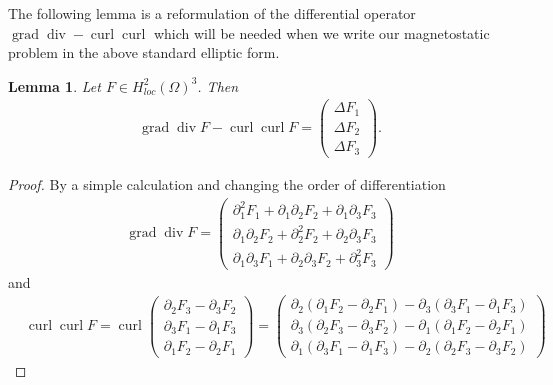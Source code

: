 \documentclass[12pt,a4paper]{article}
\numberwithin{equation}{subsection}
\newtheorem{lemma}{Lemma}[section]
\numberwithin{lemma}{subsection}
\theoremstyle{definition}
\DeclareMathOperator{\curl}{curl}
\DeclareMathOperator{\diver}{div}
\DeclareMathOperator{\grad}{grad}
\begin{document}
The following lemma is a reformulation of the differential operator 
$\grad \diver - \curl \curl$ which will be needed when we write our 
magnetostatic problem in the above standard elliptic form.

\begin{lemma}\label{lem:graddiv_curlcurl_equals_componentwise_laplacian}
    Let $F \in H^2_{loc}(\Omega)^3$. Then 
    \begin{align*}
        \grad \diver F - \curl \curl F 
        = \begin{pmatrix} \Delta F_1 \\ \Delta F_2 
            \\ \Delta F_3  \end{pmatrix}.
    \end{align*}
\end{lemma}
\begin{proof}
    By a simple calculation and changing the order of differentiation
    \begin{align*}
        \grad \diver F = 
            \begin{pmatrix} \partial_1^2 F_1 + \partial_1 \partial_2 F_2
                + \partial_1 \partial_3 F_3
            \\ \partial_1\partial_2 F_2 + \partial_2^2 F_2 + 
                \partial_2\partial_3 F_3
            \\ \partial_1 \partial_3 F_1 + \partial_2\partial_3 F_2
                + \partial_3^2 F_3
            \end{pmatrix}
    \end{align*}
    and 
    \begin{align*}
        &\curl \curl F = \curl \begin{pmatrix} 
            \partial_2 F_3 - \partial_3 F_2 \\ \partial_3 F_1 - \partial_1 F_3 
            \\ \partial_1 F_2 - \partial_2 F_1  \end{pmatrix}
        = \begin{pmatrix} 
            \partial_2 (\partial_1 F_2 - \partial_2 F_1)
                - \partial_3 (\partial_3 F_1 - \partial_1 F_3)
            \\ \partial_3 (\partial_2 F_3 - \partial_3 F_2)
                - \partial_1 (\partial_1 F_2 - \partial_2 F_1)
            \\ \partial_1 (\partial_3 F_1 - \partial_1 F_3)
                - \partial_2 (\partial_2 F_3 - \partial_3 F_2)  
            \end{pmatrix}

\end{align*}
\end{proof}
\end{document}

